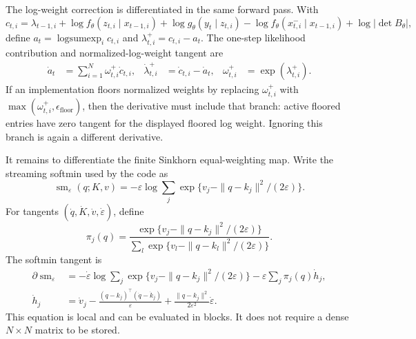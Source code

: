 The log-weight correction is differentiated in the same forward pass.  With
\[
  c_{t,i}
  =\lambda_{t-1,i}
   +\log f_\theta(z_{t,i}\mid x_{t-1,i})
   +\log g_\theta(y_t\mid z_{t,i})
   -\log f_\theta(x^-_{t,i}\mid x_{t-1,i})
   +\log|\det B_\theta|,
  \label{eq:bf-hd-ledh-compact-corrected-weight}
\]
define \(a_t=\operatorname{logsumexp}_i c_{t,i}\) and
\(\lambda^+_{t,i}=c_{t,i}-a_t\).  The one-step likelihood contribution and
normalized-log-weight tangent are
\begin{align}
  \dot a_t &= \sum_{i=1}^N \omega^+_{t,i}\dot c_{t,i},&
  \dot\lambda^+_{t,i} &= \dot c_{t,i}-\dot a_t,&
  \omega^+_{t,i}&=\exp(\lambda^+_{t,i}).
  \label{eq:bf-hd-ledh-compact-normalize-sensitivity}
\end{align}
If an implementation floors normalized weights by replacing
\(\omega^+_{t,i}\) with \(\max(\omega^+_{t,i},\epsilon_{\mathrm{floor}})\),
then the derivative must include that branch: active floored entries have zero
tangent for the displayed floored log weight.  Ignoring this branch is again a
different derivative.

It remains to differentiate the finite Sinkhorn equal-weighting map.  Write the
streaming softmin used by the code as
\begin{equation}
  \operatorname{sm}_\varepsilon(q;K,v)
  =
  -\varepsilon\log\sum_j
    \exp\{v_j-\|q-k_j\|^2/(2\varepsilon)\}.
  \label{eq:bf-hd-ledh-compact-softmin}
\end{equation}
For tangents \((\dot q,\dot K,\dot v,\dot\varepsilon)\), define
\[
  \pi_j(q)
  =
  \frac{\exp\{v_j-\|q-k_j\|^2/(2\varepsilon)\}}
       {\sum_l\exp\{v_l-\|q-k_l\|^2/(2\varepsilon)\}} .
\]
The softmin tangent is
\begin{align}
  \partial\operatorname{sm}_\varepsilon
  &=
  -\dot\varepsilon\log\sum_j
    \exp\{v_j-\|q-k_j\|^2/(2\varepsilon)\}
  -\varepsilon\sum_j\pi_j(q)\dot h_j,
  \label{eq:bf-hd-ledh-compact-softmin-jvp}\\
  \dot h_j
  &=
  \dot v_j
  -\frac{(q-k_j)^\top(\dot q-\dot k_j)}{\varepsilon}
  +\frac{\|q-k_j\|^2}{2\varepsilon^2}\dot\varepsilon .
  \nonumber
\end{align}
This equation is local and can be evaluated in blocks.  It does not require a
dense \(N\times N\) matrix to be stored.

